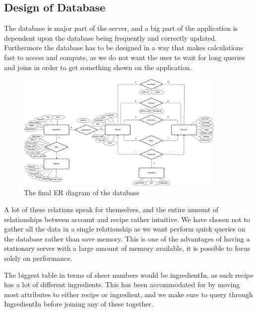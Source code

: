 \subsection{Design of Database}
\label{subsec:dbdesign}

The database is major part of the server, and a big part of the application is dependent upon the database being frequently and correctly updated. Furthermore the database has to be designed in a way that makes calculations fast to access and compute, as we do not want the user to wait for long queries and joins in order to get something shown on the application. 

\begin{figure}
\label{fig:ER-diagram}
\centering
\includegraphics[width=0.9\textwidth]{Pictures/ERdiagram}
\caption{The final ER diagram of the database}
\end{figure}

A lot of these relations speak for themselves, and the entire amount of relationships between account and recipe rather intuitive. We have chosen not to gather all the data in a single relationship as we want perform quick queries on the database rather than save memory. This is one of the advantages of having a stationary server with a large amount of memory available, it is possible to focus solely on performance. 

The biggest table in terms of sheer numbers would be ingredientIn, as each recipe has a lot of different ingredients. This has been accommodated for by moving most attributes to either recipe or ingredient, and we make sure to query through IngredientIn before joining any of these together.

